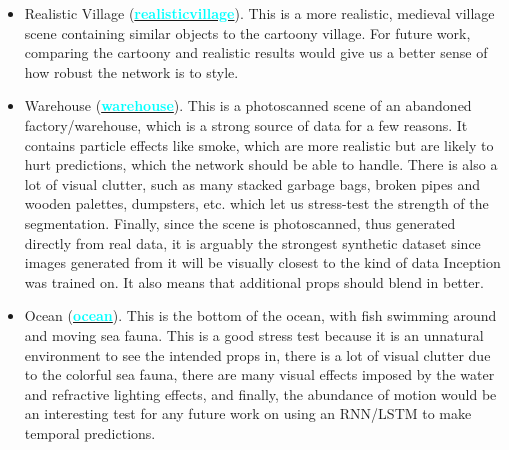 \begin{itemize}
    \item Realistic Village (\textbf{\href{https://www.unrealengine.com/marketplace/en-US/product/fantasy-and-medieval-artchitecture-kit}{\textcolor{cyan}{realisticvillage}}}). This is a more realistic, medieval village scene containing similar objects to the cartoony village. For future work, comparing the cartoony and realistic results would give us a better sense of how robust the network is to style.
    \item Warehouse (\textbf{\href{https://www.unrealengine.com/marketplace/en-US/product/megascans-abandoned-factory}{\textcolor{cyan}{warehouse}}}). This is a photoscanned scene of an abandoned factory/warehouse, which is a strong source of data for a few reasons. It contains particle effects like smoke, which are more realistic but are likely to hurt predictions, which the network should be able to handle. There is also a lot of visual clutter, such as many stacked garbage bags, broken pipes and wooden palettes, dumpsters, etc. which let us stress-test the strength of the segmentation. Finally, since the scene is photoscanned, thus generated directly from real data, it is arguably the strongest synthetic dataset since images generated from it will be visually closest to the kind of data Inception was trained on. It also means that additional props should blend in better. 
    \item Ocean (\textbf{\href{https://www.unrealengine.com/marketplace/en-US/product/ocean-floor-environment}{\textcolor{cyan}{ocean}}}). This is the bottom of the ocean, with fish swimming around and moving sea fauna. This is a good stress test because it is an unnatural environment to see the intended props in, there is a lot of visual clutter due to the colorful sea fauna, there are many visual effects imposed by the water and refractive lighting effects, and finally, the abundance of motion would be an interesting test for any future work on using an RNN/LSTM to make temporal predictions.
\end{itemize}

